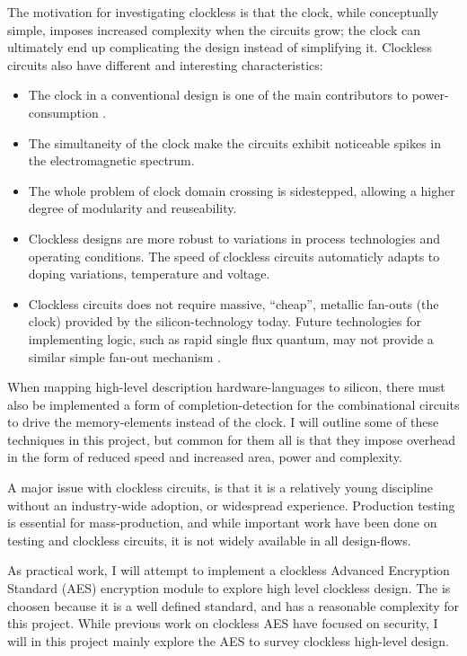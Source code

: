 The motivation for investigating clockless is that the clock, while
conceptually simple, imposes increased complexity when the circuits
grow; the clock can ultimately end up complicating the design instead
of simplifying it. Clockless circuits also have different and
interesting characteristics: 
\begin{itemize}

\item The clock in a conventional design is one of the main
  contributors to power-consumption \cite{tiwari1998reducing}.

\item The simultaneity of the clock make the circuits exhibit
  noticeable spikes in the electromagnetic spectrum.

\item The whole problem of clock domain crossing is sidestepped,
  allowing a higher degree of modularity and reuseability.

\item Clockless designs are more robust to variations in process
  technologies and operating conditions. The speed of clockless
  circuits automaticly adapts to doping variations, temperature and
  voltage.

\item Clockless circuits does not require massive, ``cheap'', metallic
  fan-outs (the clock) provided by the silicon-technology today. Future
  technologies for implementing logic, such as rapid single flux
  quantum, may not provide a similar simple fan-out mechanism \cite{rapid}.
\end{itemize}

When mapping high-level description hardware-languages to silicon,
there must also be implemented a form of completion-detection for the
combinational circuits to drive the memory-elements instead of the
clock. I will outline some of these techniques in this project, but
common for them all is that they impose overhead in the form of
reduced speed and increased area, power and complexity.

A major issue with clockless circuits, is that it is a relatively
young discipline without an industry-wide adoption, or widespread
experience. Production testing is essential for mass-production, and
while important work have been done on testing and clockless
circuits\cite{fullscan}, it is not widely available in all
design-flows.

As practical work, I will attempt to implement a clockless Advanced
Encryption Standard (AES)\cite{rijandael} encryption module to explore
high level clockless design. The is choosen because it is a well
defined standard, and has a reasonable complexity for this
project. While previous work on clockless AES\cite{claes} have focused
on security, I will in this project mainly explore the AES to survey
clockless high-level design.

